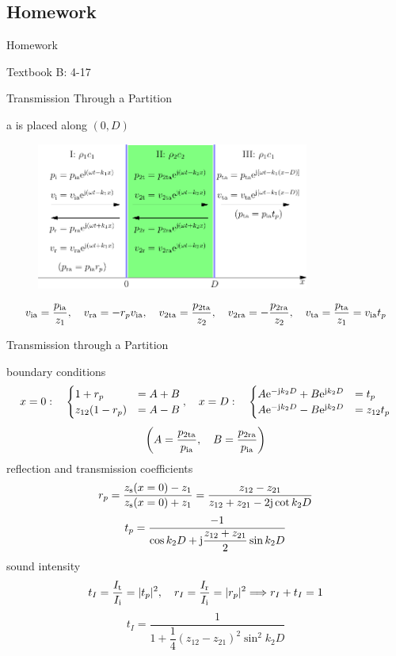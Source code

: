 \documentclass[9pt,mathserif]{beamer}
\let\emph\relax %
\begin{document}
\subsection{Homework}
\begin{frame}{Homework}
	\begin{outline}[enumerate]
		\1 Textbook B: 4-17
	\end{outline}
\end{frame}


\begin{frame}{Transmission Through a Partition}
	\begin{outline}
		\1 a \emph{partition} is placed along $(0,D)$
	\end{outline}
	\begin{figure}
		\centering
		\includegraphics[width=0.8\textwidth]{img/idealfluid/planeVertIncPartition.pdf}
	\end{figure}
	$$
	v\st{ia} = \frac{p\st{ia}}{z_1}\qc
	v\st{ra}=-r_pv\st{ia}\qc
	v\st{2ta} = \frac{p\st{2ta}}{z_2}\qc
	v\st{2ra} = -\frac{p\st{2ra}}{z_2}\qc
	v\st{ta} = \frac{p\st{ta}}{z_1} 
	=v\st{ia}t_p$$
\end{frame}

\begin{frame}{Transmission through a Partition}
	\begin{outline}
		\1 boundary conditions
		$$x = 0: \quad 
		\begin{cases}
			1+r_p &= A+B\\
			z_{12}(1-r_p) &= A-B	
		\end{cases}
		\qc
		x= D:\quad 
		\begin{cases}
			A\me^{-\mj k_2 D} +B\me^{\mj k_2D}&=t_p\\
			A\me^{-\mj k_2 D} -B\me^{\mj k_2D}&=z_{12}t_p
		\end{cases}
		$$
		$$\qty(
		A = \frac{p\st{2ta}}{p\st{ia}}
		\qc 
		B = \frac{p\st{2ra}}{p\st{ia}}
		)
		$$
		\1 reflection and transmission coefficients
		$$ r_p = \frac{z_\text{s}(x=0) - z_1}{z_\text{s}(x=0)+z_1}
		= \frac{z_{12}-z_{21}}{z_{12}+z_{21} -2\mathrm{j} \cot k_2 D}$$
		$$ t_p = \frac{-1}{\cos k_2 D + \mathrm{j} \dfrac{z_{12}+z_{21}}{2}
	\sin k_2 D}$$
		\1 sound intensity
		$$t_I = \frac{I\st{t}}{I\st{i}} = |t_p|^2\qc r_I = \frac{I\st{r}}{I\st{i}}
		 = |r_p|^2\imp r_I+t_I = 1 $$
		$$t_I = \frac{1}{1+\dfrac{1}{4} (z_{12}-z_{21})^2 \sin^2 k_2 D}$$
	\end{outline}
\end{frame}
\end{document}
